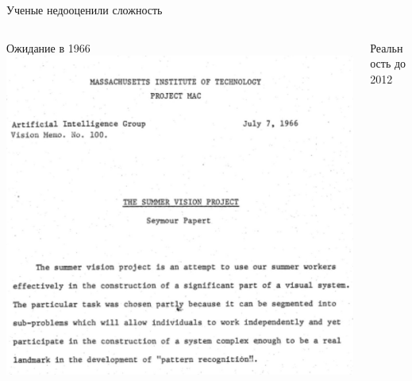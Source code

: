 \documentclass[aspectratio=169, professionalfonts]{beamer}
\begin{document}
\begin{frame}{Ученые недооценили сложность}
    \begin{columns}
        \begin{column}{.43\linewidth}
            \centering
            Ожидание в 1966
            \includegraphics[width=\linewidth]{figures/fig10-summer-vision.jpg}
        \end{column}
        \pause
        \begin{column}{.24\linewidth}
            \centering
            Реальность до 2012

\end{column}
\end{columns}
\end{frame}
\end{document}
